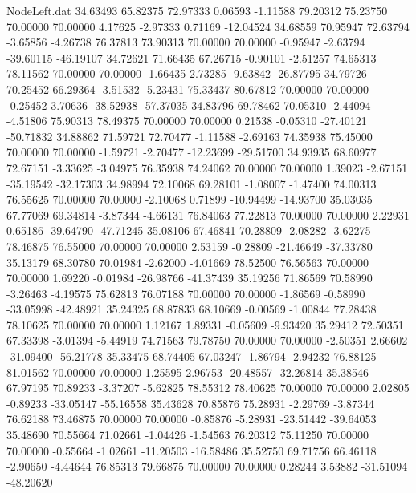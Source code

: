 \begin{filecontents}{NodeLeft.dat}
  34.63493   65.82375   72.97333     0.06593   -1.11588   79.20312   75.23750   70.00000   70.00000    4.17625   -2.97333    0.71169  -12.04524
  34.68559   70.95947   72.63794    -3.65856   -4.26738   76.37813   73.90313   70.00000   70.00000   -0.95947   -2.63794  -39.60115  -46.19107
  34.72621   71.66435   67.26715    -0.90101   -2.51257   74.65313   78.11562   70.00000   70.00000   -1.66435    2.73285   -9.63842  -26.87795
  34.79726   70.25452   66.29364    -3.51532   -5.23431   75.33437   80.67812   70.00000   70.00000   -0.25452    3.70636  -38.52938  -57.37035
  34.83796   69.78462   70.05310    -2.44094   -4.51806   75.90313   78.49375   70.00000   70.00000    0.21538   -0.05310  -27.40121  -50.71832
  34.88862   71.59721   72.70477    -1.11588   -2.69163   74.35938   75.45000   70.00000   70.00000   -1.59721   -2.70477  -12.23699  -29.51700
  34.93935   68.60977   72.67151    -3.33625   -3.04975   76.35938   74.24062   70.00000   70.00000    1.39023   -2.67151  -35.19542  -32.17303
  34.98994   72.10068   69.28101    -1.08007   -1.47400   74.00313   76.55625   70.00000   70.00000   -2.10068    0.71899  -10.94499  -14.93700
  35.03035   67.77069   69.34814    -3.87344   -4.66131   76.84063   77.22813   70.00000   70.00000    2.22931    0.65186  -39.64790  -47.71245
  35.08106   67.46841   70.28809    -2.08282   -3.62275   78.46875   76.55000   70.00000   70.00000    2.53159   -0.28809  -21.46649  -37.33780
  35.13179   68.30780   70.01984    -2.62000   -4.01669   78.52500   76.56563   70.00000   70.00000    1.69220   -0.01984  -26.98766  -41.37439
  35.19256   71.86569   70.58990    -3.26463   -4.19575   75.62813   76.07188   70.00000   70.00000   -1.86569   -0.58990  -33.05998  -42.48921
  35.24325   68.87833   68.10669    -0.00569   -1.00844   77.28438   78.10625   70.00000   70.00000    1.12167    1.89331   -0.05609   -9.93420
  35.29412   72.50351   67.33398    -3.01394   -5.44919   74.71563   79.78750   70.00000   70.00000   -2.50351    2.66602  -31.09400  -56.21778
  35.33475   68.74405   67.03247    -1.86794   -2.94232   76.88125   81.01562   70.00000   70.00000    1.25595    2.96753  -20.48557  -32.26814
  35.38546   67.97195   70.89233    -3.37207   -5.62825   78.55312   78.40625   70.00000   70.00000    2.02805   -0.89233  -33.05147  -55.16558
  35.43628   70.85876   75.28931    -2.29769   -3.87344   76.62188   73.46875   70.00000   70.00000   -0.85876   -5.28931  -23.51442  -39.64053
  35.48690   70.55664   71.02661    -1.04426   -1.54563   76.20312   75.11250   70.00000   70.00000   -0.55664   -1.02661  -11.20503  -16.58486
  35.52750   69.71756   66.46118    -2.90650   -4.44644   76.85313   79.66875   70.00000   70.00000    0.28244    3.53882  -31.51094  -48.20620

\end{filecontents}
